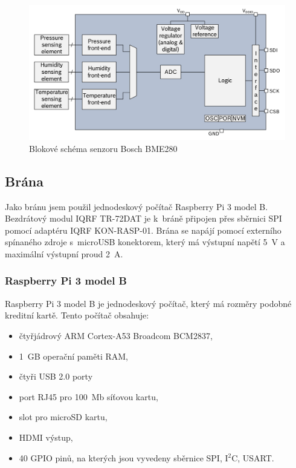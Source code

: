 \documentclass[12pt,a4paper]{article}
\begin{document}
\begin{figure}[H]
\centering
\label{fig:bme280-block-diagram}
\includegraphics[width = 128mm]{img/bme280-block-diagram.png}
\caption{Blokové schéma senzoru Bosch BME280}
\end{figure}

\newpage

\subsection{Brána}

Jako bránu jsem použil jednodeskový počítač Raspberry Pi 3 model B. Bezdrátový modul IQRF TR-72DAT je k~bráně připojen přes sběrnici SPI pomocí adaptéru IQRF KON-RASP-01. Brána se napájí pomocí externího spínaného zdroje s~microUSB konektorem, který má výstupní napětí 5~V a maximální výstupní proud 2~A.

\subsubsection{Raspberry Pi 3 model B}

Raspberry Pi 3 model B je jednodeskový počítač, který má rozměry podobné kreditní kartě. Tento počítač obsahuje:

\begin{itemize}
  \item čtyřjádrový ARM Cortex-A53 Broadcom BCM2837,
  \item 1~GB operační paměti RAM,
  \item čtyři USB 2.0 porty
  \item port RJ45 pro 100~Mb síťovou kartu,
  \item slot pro microSD kartu,
  \item HDMI výstup,
  \item 40 GPIO pinů, na kterých jsou vyvedeny sběrnice SPI, I$^{2}$C, USART.
\end{itemize}
\end{document}
